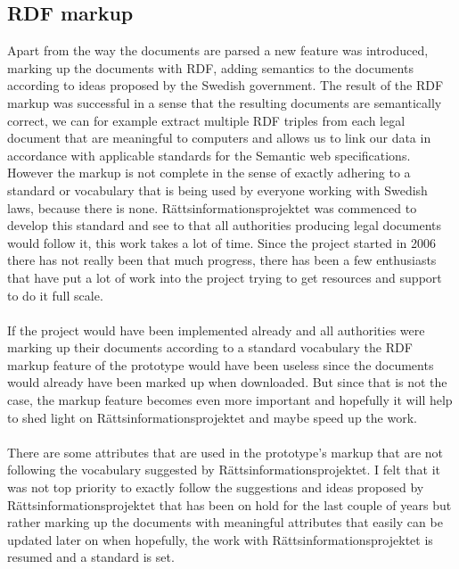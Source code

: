 \subsection{RDF markup}
Apart from the way the documents are parsed a new feature was introduced, marking up the documents with RDF, adding semantics to the documents according to ideas proposed by the Swedish government. The result of the RDF markup was successful in a sense that the resulting documents are semantically correct, we can for example extract multiple RDF triples from each legal document that are meaningful to computers and allows us to link our data in accordance with applicable standards for the Semantic web specifications. However the markup is not complete in the sense of exactly adhering to a standard or vocabulary that is being used by everyone working with Swedish laws, because there is none. Rättsinformationsprojektet was commenced to develop this standard and see to that all authorities producing legal documents would follow it, this work takes a lot of time. Since the project started in 2006 there has not really been that much progress, there has been a few enthusiasts that have put a lot of work into the project trying to get resources and support to do it full scale.\\\\
If the project would have been implemented already and all authorities were marking up their documents according to a standard vocabulary the RDF markup feature of the prototype would have been useless since the documents would already have been marked up when downloaded. But since that is not the case, the markup feature becomes even more important and hopefully it will help to shed light on Rättsinformationsprojektet and maybe speed up the work.\\\\
There are some attributes that are used in the prototype’s markup that are not following the vocabulary suggested by Rättsinformationsprojektet. I felt that it was not top priority to exactly follow the suggestions and ideas proposed by Rättsinformationsprojektet that has been on hold for the last couple of years but rather marking up the documents with meaningful attributes that easily can be updated later on when hopefully, the work with Rättsinformationsprojektet is resumed and a standard is set.  

